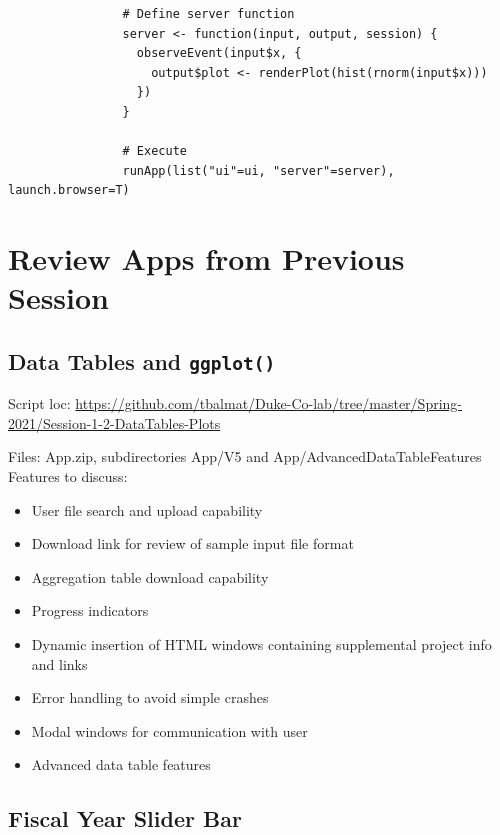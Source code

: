 \documentclass[10pt, letterpaper]{article}
\begin{document}
\begin{spacing}{1.0}
\begin{verbatim}
                # Define server function
                server <- function(input, output, session) {
                  observeEvent(input$x, {
                    output$plot <- renderPlot(hist(rnorm(input$x)))
                  })
                }
                
                # Execute
                runApp(list("ui"=ui, "server"=server), launch.browser=T)
\end{verbatim}
\normalsize


\section{Review Apps from Previous Session}\label{sec:prevapps}

\subsection{Data Tables and \texttt{ggplot()}}\label{sec:prevapp-dtggplot}

Script loc:
\small
\url{https://github.com/tbalmat/Duke-Co-lab/tree/master/Spring-2021/Session-1-2-DataTables-Plots}\\
\normalsize

Files:  App.zip, subdirectories App/V5 and App/AdvancedDataTableFeatures\\

Features to discuss:

\begin{itemize}[noitemsep]
    \item User file search and upload capability
    \item Download link for review of sample input file format
    \item Aggregation table download capability
    \item Progress indicators
    \item Dynamic insertion of HTML windows containing supplemental project info and links
    \item Error handling to avoid simple crashes
    \item Modal windows for communication with user
    \item Advanced data table features
\end{itemize}

\subsection{Fiscal Year Slider Bar}\label{sec:prevapp-fyslider}


\end{spacing}
\end{document}
